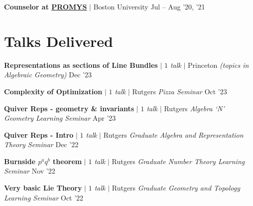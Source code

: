 \resumeProjectHeading
{\textbf{Counselor at \href{https://promys.org}{PROMYS}} $|$ Boston University }
{Jul -- Aug '20, '21}


\resumeSubHeadingListEnd



\section{Talks Delivered}
\resumeSubHeadingListStart


\resumeProjectHeading
{\textbf{Representations as sections of Line Bundles} $|$ \emph{$1$ talk} $|$ Princeton \textit{(topics in Algebraic Geometry)}}
{Dec '23}
{}
\vspace{-20pt}

\resumeProjectHeading
{\textbf{Complexity of Optimization} $|$ \emph{$1$ talk} $|$ Rutgers \textit{Pizza Seminar}}
{Oct '23}
{}
\vspace{-20pt}


\resumeProjectHeading
{\textbf{Quiver Reps -  geometry \& invariants} $|$ \emph{$1$ talk} $|$ Rutgers \textit{Algebra `N' Geometry Learning Seminar}}
{Apr '23}
{}
\vspace{-20pt}

\resumeProjectHeading
{\textbf{Quiver Reps - Intro} $|$ \emph{$1$ talk} $|$ Rutgers \textit{Graduate Algebra and Representation Theory Seminar}}
{Dec '22}
{}
\vspace{-20pt}

\resumeProjectHeading
{\textbf{Burnside $p^aq^b$ theorem} $|$ \emph{$1$ talk} $|$ Rutgers \textit{Graduate Number Theory Learning Seminar}}
{Nov '22}
{}
\vspace{-20pt}

\resumeProjectHeading
{\textbf{Very basic Lie Theory} $|$ \emph{$1$ talk} $|$ Rutgers \textit{Graduate Geometry and Topology Learning Seminar}}
{Oct '22}
{}
\vspace{-20pt}

